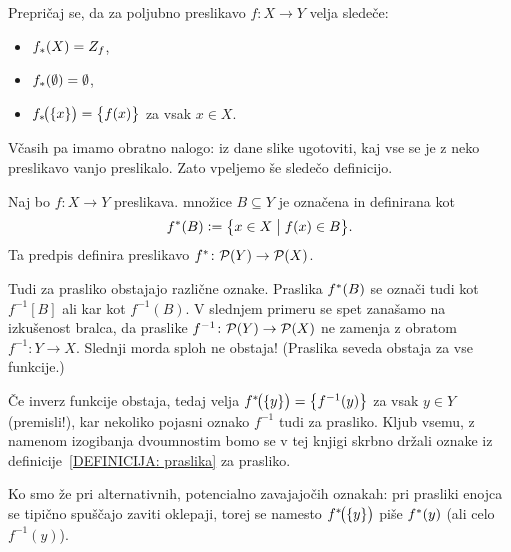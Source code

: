 		\begin{vaja}
			Prepričaj se, da za poljubno preslikavo $f\colon X \to Y$ velja sledeče:
			\begin{itemize}
				\item
					$\img{f}{X} = Z_f$,
				\item
					$\img{f}{\emptyset} = \emptyset$,
				\item
					$\img[1]{f}{\set{x}} = \set[1]{f(x)}$ za vsak $x \in X$.
			\end{itemize}
		\end{vaja}
		
		
		Včasih pa imamo obratno nalogo: iz dane slike ugotoviti, kaj vse se je z neko preslikavo vanjo preslikalo. Zato vpeljemo še sledečo definicijo.
		
		\begin{definicija}\label{DEFINICIJA: praslika}
			Naj bo $f\colon X \to Y$ preslikava.  množice $B \subseteq Y$ je označena in definirana kot
			\[\pim{f}{B} \dfeq \set[1]{x \in X}{f(x) \in B}.\]
			Ta predpis definira preslikavo $\pim{f}\colon \pst(Y) \to \pst(X)$.
		\end{definicija}
		
		\begin{opomba}
			Tudi za prasliko obstajajo različne oznake. Praslika $\pim{f}{B}$ se označi tudi kot $f^{-1}[B]$ ali kar kot $f^{-1}(B)$. V slednjem primeru se spet zanašamo na izkušenost bralca, da praslike $f^{-1}\colon \mathcal{P}(Y) \to \mathcal{P}(X)$ ne zamenja z obratom $f^{-1}\colon Y \to X$. Slednji morda sploh ne obstaja! (Praslika seveda obstaja za vse funkcije.)
			
			Če inverz funkcije obstaja, tedaj velja $\pim[1]{f}{\set{y}} = \set[1]{f^{-1}(y)}$ za vsak $y \in Y$ (premisli!), kar nekoliko pojasni oznako $f^{-1}$ tudi za prasliko. Kljub vsemu, z namenom izogibanja dvoumnostim bomo se v tej knjigi skrbno držali oznake iz definicije~\ref{DEFINICIJA: praslika} za prasliko.
			
			Ko smo že pri alternativnih, potencialno zavajajočih oznakah: pri prasliki enojca se tipično spuščajo zaviti oklepaji, torej se namesto $\pim[1]{f}{\set{y}}$ piše $\pim{f}{y}$ (ali celo $f^{-1}(y)$).
		\end{opomba}
		
		
	
